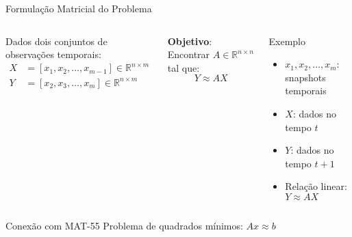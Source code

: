 \documentclass[aspectratio=169]{beamer}
\begin{document}
\begin{frame}{Formulação Matricial do Problema}
    \begin{columns}
        Dados dois conjuntos de observações temporais:
        \begin{align}
            X &= [x_1, x_2, \ldots, x_{m-1}] \in \mathbb{R}^{n \times m}\\
            Y &= [x_2, x_3, \ldots, x_m] \in \mathbb{R}^{n \times m}
        \end{align}
        
        \textbf{Objetivo}: Encontrar $A \in \mathbb{R}^{n \times n}$ tal que:
        \begin{equation}
            Y \approx AX
        \end{equation}
        
        \begin{block}{Exemplo}
            \begin{itemize}
                \item $x_1, x_2, \ldots, x_m$: snapshots temporais
                \item $X$: dados no tempo $t$
                \item $Y$: dados no tempo $t+1$
                \item Relação linear: $Y \approx AX$
            \end{itemize}
        \end{block}
    \end{columns}
    
    \vspace{0.5cm}
    \begin{block}{Conexão com MAT-55}
        Problema de quadrados mínimos: $Ax \approx b$
    \end{block}
\end{frame}
\end{document}
